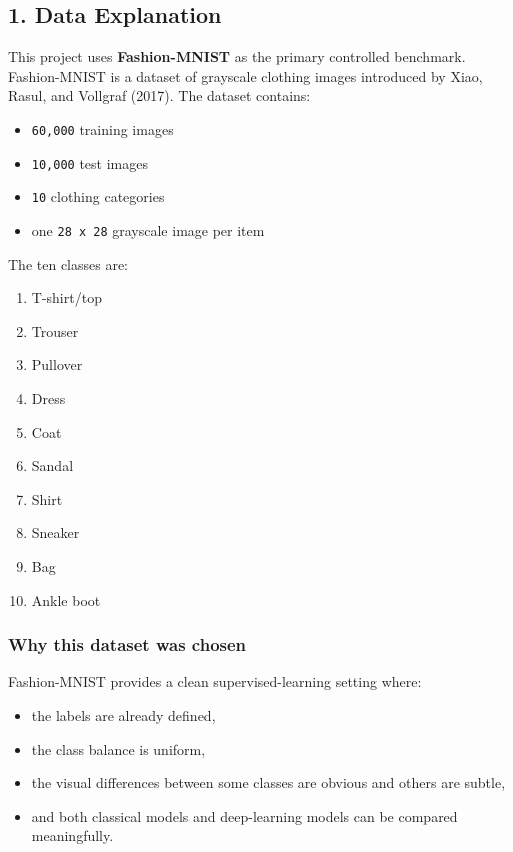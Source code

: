 \documentclass[11pt]{article}
\providecommand{\tightlist}{%
      \setlength{\itemsep}{0pt}\setlength{\parskip}{0pt}}
\begin{document}
    \subsection{1. Data Explanation}\label{data-explanation}

This project uses \textbf{Fashion-MNIST} as the primary controlled
benchmark. Fashion-MNIST is a dataset of grayscale clothing images
introduced by Xiao, Rasul, and Vollgraf (2017). The dataset contains:

\begin{itemize}
\tightlist
\item
  \texttt{60,000} training images
\item
  \texttt{10,000} test images
\item
  \texttt{10} clothing categories
\item
  one \texttt{28\ x\ 28} grayscale image per item
\end{itemize}

The ten classes are:

\begin{enumerate}
\def\labelenumi{\arabic{enumi}.}
\tightlist
\item
  T-shirt/top
\item
  Trouser
\item
  Pullover
\item
  Dress
\item
  Coat
\item
  Sandal
\item
  Shirt
\item
  Sneaker
\item
  Bag
\item
  Ankle boot
\end{enumerate}

\subsubsection{Why this dataset was
chosen}\label{why-this-dataset-was-chosen}

Fashion-MNIST provides a clean supervised-learning setting where:

\begin{itemize}
\tightlist
\item
  the labels are already defined,
\item
  the class balance is uniform,
\item
  the visual differences between some classes are obvious and others are
  subtle,
\item
  and both classical models and deep-learning models can be compared
  meaningfully.
\end{itemize}
\end{document}
